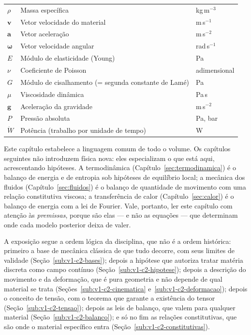 \documentclass[12pt,a4paper]{article}
\numberwithin{equation}{section}
\numberwithin{table}{section}
\numberwithin{figure}{section}
\begin{document}
{\begin{longtable}{>{\raggedright\arraybackslash}p{2.6cm} >{\raggedright\arraybackslash}p{9.2cm} >{\raggedright\arraybackslash}p{2.6cm}}
	$\rho$ & Massa específica & kg\,m$^{-3}$ \\
	$\mathbf{v}$ & Vetor velocidade do material & m\,s$^{-1}$ \\
	$\mathbf{a}$ & Vetor aceleração & m\,s$^{-2}$ \\
	$\boldsymbol{\omega}$ & Vetor velocidade angular & rad\,s$^{-1}$ \\
	$E$ & Módulo de elasticidade (Young) & Pa \\
	$\nu$ & Coeficiente de Poisson & adimensional \\
	$G$ & Módulo de cisalhamento (= segunda constante de Lamé) & Pa \\
	$\mu$ & Viscosidade dinâmica & Pa\,s \\
	$\mathbf{g}$ & Aceleração da gravidade & m\,s$^{-2}$ \\
	$P$ & Pressão absoluta & Pa, bar \\
	$\dot{W}$ & Potência (trabalho por unidade de tempo) & W \\
	\bottomrule
\end{longtable}
}




Este capítulo estabelece a linguagem comum de todo o volume. Os capítulos
seguintes não introduzem física nova: eles especializam o que está aqui,
acrescentando hipóteses. A termodinâmica (Capítulo~\ref{sec:termodinamica}) é
o balanço de energia e de entropia sob hipóteses de equilíbrio local; a
mecânica dos fluidos (Capítulo~\ref{sec:fluidos}) é o balanço de quantidade de
movimento com uma relação constitutiva viscosa; a transferência de calor
(Capítulo~\ref{sec:calor}) é o balanço de energia com a lei de Fourier. Vale,
portanto, ler este capítulo com atenção às \emph{premissas}, porque são elas
--- e não as equações --- que determinam onde cada modelo posterior deixa de
valer.

A exposição segue a ordem lógica da disciplina, que não é a ordem histórica:
primeiro a base de mecânica clássica de que tudo decorre, com seus limites de
validade (Seção~\ref{sub:v1-c2-bases}); depois a hipótese que autoriza tratar
matéria discreta como campo contínuo (Seção~\ref{sub:v1-c2-hipotese}); depois
a descrição do movimento e da
deformação, que é pura geometria e não depende de qual material se trata
(Seções~\ref{sub:v1-c2-cinematica} e~\ref{sub:v1-c2-deformacao}); depois o
conceito de tensão, com o teorema que garante a existência do tensor
(Seção~\ref{sub:v1-c2-tensao}); depois as leis de balanço, que valem para
qualquer material (Seção~\ref{sub:v1-c2-balanco}); e só no fim as relações
constitutivas, que são onde o material específico entra
(Seção~\ref{sub:v1-c2-constitutivas}).
\end{document}
